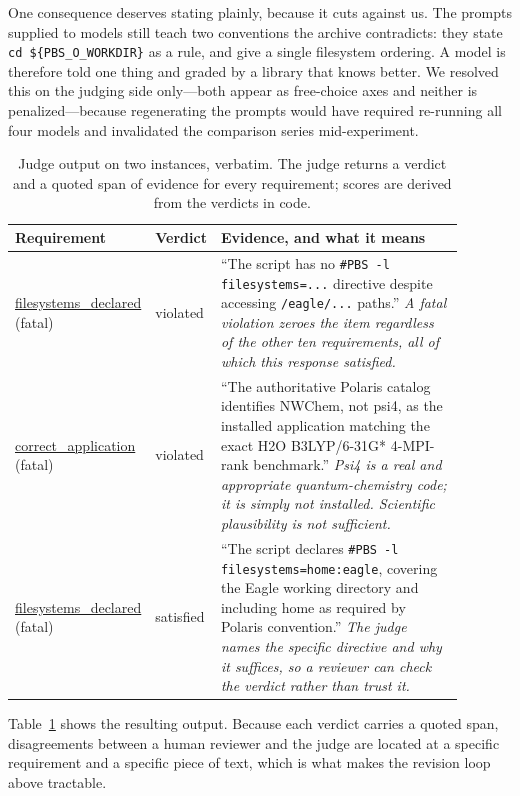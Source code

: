 \documentclass[conference]{IEEEtran}
\begin{document}
One consequence deserves stating plainly, because it cuts against us. The prompts supplied to models still teach two conventions the archive contradicts: they state \texttt{cd \$\{PBS\_O\_WORKDIR\}} as a rule, and give a single filesystem ordering. A model is therefore told one thing and graded by a library that knows better. We resolved this on the judging side only---both appear as free-choice axes and neither is penalized---because regenerating the prompts would have required re-running all four models and invalidated the comparison series mid-experiment.

\begin{table}[t]
\centering
\scriptsize
\caption{Judge output on two instances, verbatim. The judge returns a verdict and a quoted span of evidence for every requirement; scores are derived from the verdicts in code.}
\label{tab:judge-examples}
\begin{tabular}{@{}p{0.17\linewidth}p{0.10\linewidth}p{0.62\linewidth}@{}}
\toprule
Requirement & Verdict & Evidence, and what it means \\
\midrule
\url{filesystems_declared} (fatal) & violated & ``The script has no \texttt{\#PBS -l filesystems=...} directive despite accessing \texttt{/eagle/...} paths.'' \newline \emph{A fatal violation zeroes the item regardless of the other ten requirements, all of which this response satisfied.} \\
\addlinespace
\url{correct_application} (fatal) & violated & ``The authoritative Polaris catalog identifies NWChem, not psi4, as the installed application matching the exact H2O B3LYP/6-31G* 4-MPI-rank benchmark.'' \newline \emph{Psi4 is a real and appropriate quantum-chemistry code; it is simply not installed. Scientific plausibility is not sufficient.} \\
\addlinespace
\url{filesystems_declared} (fatal) & satisfied & ``The script declares \texttt{\#PBS -l filesystems=home:eagle}, covering the Eagle working directory and including home as required by Polaris convention.'' \newline \emph{The judge names the specific directive and why it suffices, so a reviewer can check the verdict rather than trust it.} \\
\bottomrule
\end{tabular}
\end{table}

Table~\ref{tab:judge-examples} shows the resulting output. Because each verdict carries a quoted span, disagreements between a human reviewer and the judge are located at a specific requirement and a specific piece of text, which is what makes the revision loop above tractable.
\end{document}
